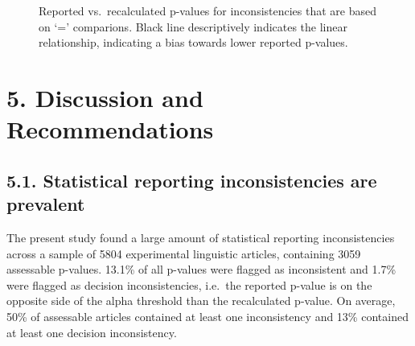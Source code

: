 \documentclass[
  doc,
  longtable,
  nolmodern,
  notxfonts,
  notimes,
  colorlinks=true,linkcolor=blue,citecolor=blue,urlcolor=blue]{apa7}
\begin{document}
\begin{figure}

\caption{\label{fig-scatter}Reported vs.~recalculated p-values for
inconsistencies that are based on `=' comparions. Black line
descriptively indicates the linear relationship, indicating a bias
towards lower reported p-values.}


\end{figure}%

\section{5. Discussion and
Recommendations}\label{discussion-and-recommendations}

\subsection{5.1. Statistical reporting inconsistencies are
prevalent}\label{statistical-reporting-inconsistencies-are-prevalent}

The present study found a large amount of statistical reporting
inconsistencies across a sample of 5804 experimental linguistic
articles, containing 3059 assessable p-values. 13.1\% of all p-values
were flagged as inconsistent and 1.7\% were flagged as decision
inconsistencies, i.e.~the reported p-value is on the opposite side of
the alpha threshold than the recalculated p-value. On average, 50\% of
assessable articles contained at least one inconsistency and 13\%
contained at least one decision inconsistency.
\end{document}
